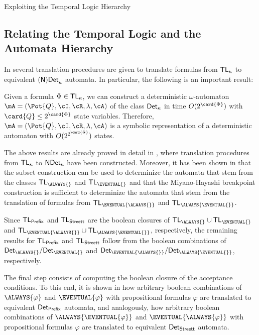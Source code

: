 \documentclass[copyright,creativecommons]{eptcs}
\begin{document}
\begin{section}{Exploiting the Temporal Logic Hierarchy}
\subsection{Relating the Temporal Logic and the Automata Hierarchy}

In \cite{Schn01b,Schn03} several translation procedures are given to translate formulas from ${\sf TL}_{\kappa}$ to equivalent ${\sf (N)Det}_\kappa$ automata. In particular, the following is an important result:

\begin{theorem} \label{borel_thm}
Given a formula $\Phi \in {\sf TL}_\kappa$, we can construct a deterministic $\omega$-automaton $\mA=(\Pot{Q},\cI,\cR,\lambda,\cA)$ of the class ${\sf Det}_\kappa$ in time $O(2^{\card{\Phi}})$ with $\card{Q}\leq 2^{\card{\Phi}}$ state variables. Therefore, $\mA=(\Pot{Q},\cI,\cR,\lambda,\cA)$ is a symbolic representation of a deterministic automaton with $O(2^{2^{\card{\Phi}}})$ states.
\end{theorem}

\noindent The above results are already proved in detail in \cite{Schn03}, where translation procedures from ${\sf TL}_\kappa$ to ${\sf NDet}_\kappa$ have been constructed. Moreover, it has been shown in \cite{Schn03} that the subset construction can be used to determinize the automata that stem from the classes ${\sf TL}_{\ALWAYS{}}$ and ${\sf TL}_{\EVENTUAL{}}$ and that the Miyano-Hayashi breakpoint construction is sufficient to determinize the automata that stem from the translation of formulas from ${\sf TL}_{\EVENTUAL{\ALWAYS{}}}$ and ${\sf TL}_{\ALWAYS{\EVENTUAL{}}}$.

Since ${\sf TL}_{\sf Prefix}$ and ${\sf TL}_{\sf Streett}$ are the boolean closures of ${\sf TL}_{\ALWAYS{}}\cup{\sf TL}_{\EVENTUAL{}}$ and ${\sf TL}_{\EVENTUAL{\ALWAYS{}}}\cup{\sf TL}_{\ALWAYS{\EVENTUAL{}}}$, respectively, the remaining results for ${\sf TL}_{\sf Prefix}$ and ${\sf TL}_{\sf Streett}$ follow from the boolean combinations of ${\sf Det}_{\ALWAYS{}}/{\sf Det}_{\EVENTUAL{}}$ and ${\sf Det}_{\EVENTUAL{\ALWAYS{}}}/{\sf Det}_{\ALWAYS{\EVENTUAL{}}}$, respectively.

The final step consists of computing the boolean closure of the acceptance conditions. To this end, it is shown in \cite{Schn03} how arbitrary boolean combinations of $\ALWAYS{\varphi}$ and $\EVENTUAL{\varphi}$ with propositional formulas $\varphi$ are translated to equivalent ${\sf Det}_{\sf Prefix}$ automata, and analogously, how arbitrary boolean combinations of $\ALWAYS{\EVENTUAL{\varphi}}$ and $\EVENTUAL{\ALWAYS{\varphi}}$ with propositional formulas $\varphi$ are translated to equivalent ${\sf Det}_{\sf Streett}$ automata.

\end{section}
\end{document}
